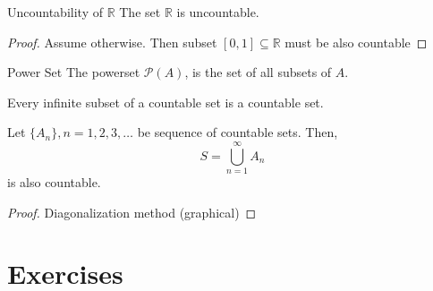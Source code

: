 \begin{theo}{Uncountability of $\mathbb{R}$}{}
    The set $\mathbb{R}$ is uncountable.
    \begin{proof}
        Assume otherwise. Then subset $[0,1] \subseteq \mathbb{R}$ must
        be also countable
    \end{proof}
\end{theo}

\begin{defi}{Power Set}{}
    The powerset $\mathcal{P}(A)$, is the set of all subsets of $A$.
\end{defi}

\begin{theo}{}{}
    Every infinite subset of a countable set is a countable set.
\end{theo}

\begin{theo}{}{}
    Let $\{ A_n\}, n = 1,2,3, \ldots$ be sequence of
    countable sets. Then,
    \[ S = \bigcup_{n=1}^{\infty} A_n\]
    is also countable.
    \begin{proof} Diagonalization method (graphical)
    \end{proof}
\end{theo}

\section{Exercises}

